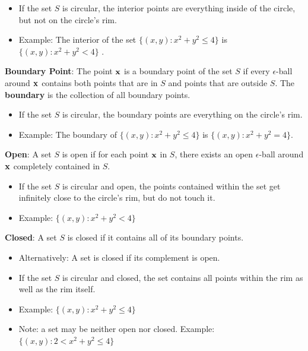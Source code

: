 \documentclass[]{book}
\providecommand{\tightlist}{%
  \setlength{\itemsep}{0pt}\setlength{\parskip}{0pt}}
\theoremstyle{definition}
\theoremstyle{definition}
\theoremstyle{definition}
\theoremstyle{remark}
\begin{document}
\begin{itemize}
\tightlist
\item
  If the set \(S\) is circular, the interior points are everything
  inside of the circle, but not on the circle's rim.
\item
  Example: The interior of the set \(\{ (x,y) : x^2+y^2\le 4 \}\) is
  \(\{ (x,y) : x^2+y^2< 4 \}\) .
\end{itemize}

\textbf{Boundary Point}: The point \(\bf x\) is a boundary point of the
set \(S\) if every \(\epsilon\)-ball around \(\bf x\) contains both
points that are in \(S\) and points that are outside \(S\). The
\textbf{boundary} is the collection of all boundary points.

\begin{itemize}
\tightlist
\item
  If the set \(S\) is circular, the boundary points are everything on
  the circle's rim.
\item
  Example: The boundary of \(\{ (x,y) : x^2+y^2\le 4 \}\) is
  \(\{ (x,y) : x^2+y^2 = 4 \}\).
\end{itemize}

\textbf{Open}: A set \(S\) is open if for each point \(\bf x\) in \(S\),
there exists an open \(\epsilon\)-ball around \(\bf x\) completely
contained in \(S\).

\begin{itemize}
\tightlist
\item
  If the set \(S\) is circular and open, the points contained within the
  set get infinitely close to the circle's rim, but do not touch it.
\item
  Example: \(\{ (x,y) : x^2+y^2<4 \}\)
\end{itemize}

\textbf{Closed}: A set \(S\) is closed if it contains all of its
boundary points.

\begin{itemize}
\tightlist
\item
  Alternatively: A set is closed if its complement is open.
\item
  If the set \(S\) is circular and closed, the set contains all points
  within the rim as well as the rim itself.
\item
  Example: \(\{ (x,y) : x^2+y^2\le 4 \}\)
\item
  Note: a set may be neither open nor closed. Example:
  \(\{ (x,y) : 2 < x^2+y^2\le 4 \}\)
\end{itemize}
\end{document}
